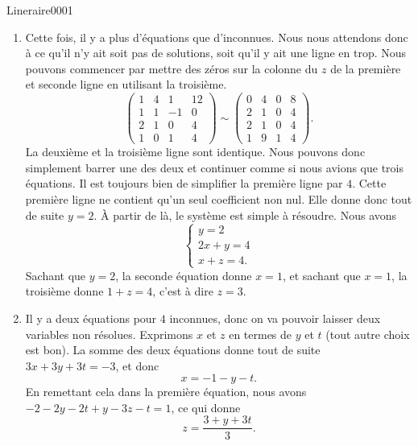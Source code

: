 \begin{corrige}{Lineraire0001}
\begin{enumerate}
\begin{equation}
\begin{array}{cccc|c}
					      0	&	0	&	1	&	3	&	1	
				      \end{array}\right).				      
			\end{equation}
			Sur cette dernière matrice, les solutions se lisent encore plus facilement.
		\item
			Cette fois, il y a plus d'équations que d'inconnues. Nous nous attendons donc à ce qu'il n'y ait soit pas de solutions, soit qu'il y ait une ligne \og en trop\fg. Nous pouvons commencer par mettre des zéros sur la colonne du $z$ de la première et seconde ligne en utilisant la troisième.
			\begin{equation}
				\left(\begin{array}{ccc|c}
					1	&	4	&	1	&	12	\\	
					1	&	1	&	-1	&	0	\\	
						2	&	1	&	0	&	4	\\	
							1	&	0	&	1	&	4	
						\end{array}\right)
						\sim
				\left(\begin{array}{ccc|c}
					0	&	4	&	0	&	8	\\
					2	&	1	&	0	&	4\\
					2	&	1	&	0	&	4\\
					1	&	9	&	1	&	4
				\end{array}\right).
			\end{equation}
			La deuxième et la troisième ligne sont identique. Nous pouvons donc simplement barrer une des deux et continuer comme si nous avions que trois équations. Il est toujours bien de simplifier la première ligne par $4$. Cette première ligne ne contient qu'un seul coefficient non nul. Elle donne donc tout de suite $y=2$. À partir de là, le système est simple à résoudre. Nous avons
			\begin{equation}
				\left\{
				\begin{array}{ll}
					y=2\\
					2x+y=4\\
					x+z=4.
				\end{array}
				\right.
			\end{equation}
			Sachant que $y=2$, la seconde équation donne $x=1$, et sachant que $x=1$, la troisième donne $1+z=4$, c'est à dire $z=3$.

		\item
			Il y a deux équations pour $4$ inconnues, donc on va pouvoir laisser deux variables non résolues. Exprimons $x$ et $z$ en termes de $y$ et $t$ (tout autre choix est bon). La somme des deux équations donne tout de suite $3x+3y+3t=-3$, et donc
			\begin{equation}
				x=-1-y-t.
			\end{equation}
			En remettant cela dans la première équation, nous avons $-2-2y-2t+y-3z-t=1$, ce qui donne
			\begin{equation}
				z=\frac{ 3+y+3t }{ 3 }.
			\end{equation}
	\end{enumerate}

\end{corrige}
